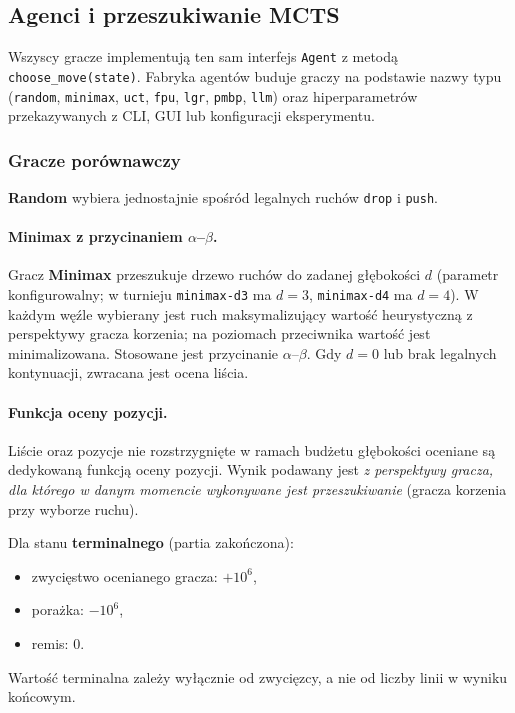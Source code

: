 \documentclass[11pt, a4paper]{article}
\begin{document}
\subsection{Agenci i przeszukiwanie MCTS}

Wszyscy gracze implementują ten sam interfejs \texttt{Agent} z metodą \texttt{choose\_move(state)}. Fabryka agentów buduje graczy na podstawie nazwy typu (\texttt{random}, \texttt{minimax}, \texttt{uct}, \texttt{fpu}, \texttt{lgr}, \texttt{pmbp}, \texttt{llm}) oraz hiperparametrów przekazywanych z CLI, GUI lub konfiguracji eksperymentu.

\subsubsection{Gracze porównawczy}
\label{sec:gracze-porownawczy}

\textbf{Random} wybiera jednostajnie spośród legalnych ruchów \texttt{drop} i \texttt{push}.

\paragraph{Minimax z przycinaniem $\alpha$--$\beta$.}
Gracz \textbf{Minimax} przeszukuje drzewo ruchów do zadanej głębokości $d$ (parametr konfigurowalny; w turnieju \texttt{minimax-d3} ma $d=3$, \texttt{minimax-d4} ma $d=4$). W każdym węźle wybierany jest ruch maksymalizujący wartość heurystyczną z perspektywy gracza korzenia; na poziomach przeciwnika wartość jest minimalizowana. Stosowane jest przycinanie $\alpha$--$\beta$. Gdy $d=0$ lub brak legalnych kontynuacji, zwracana jest ocena liścia.

\paragraph{Funkcja oceny pozycji.}
Liście oraz pozycje nie rozstrzygnięte w ramach budżetu głębokości oceniane są dedykowaną funkcją oceny pozycji. Wynik podawany jest \emph{z perspektywy gracza, dla którego w danym momencie wykonywane jest przeszukiwanie} (gracza korzenia przy wyborze ruchu).

Dla stanu \textbf{terminalnego} (partia zakończona):
\begin{itemize}
    \item zwycięstwo ocenianego gracza: $+10^6$,
    \item porażka: $-10^6$,
    \item remis: $0$.
\end{itemize}
\noindent
Wartość terminalna zależy wyłącznie od zwycięzcy, a nie od liczby linii w wyniku końcowym.
\end{document}
